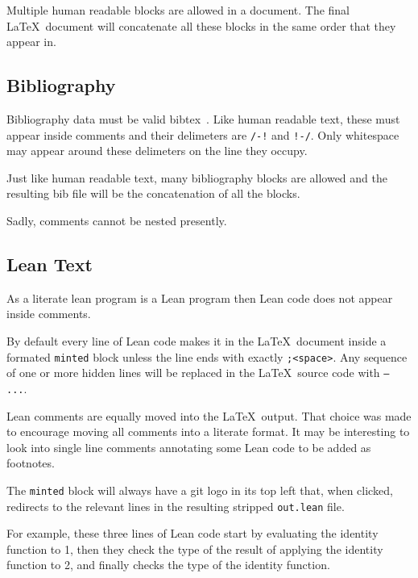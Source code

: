 Multiple human readable blocks are allowed in a document.
The final \LaTeX~document will concatenate all these blocks in the same order that they appear in.

\subsection{Bibliography}

Bibliography data must be valid bibtex~\cite{patashnik1984bibtex}.
Like human readable text, these must appear inside comments and their delimeters are \texttt{/-!} and \texttt{!-/}.
Only whitespace may appear around these delimeters on the line they occupy.

Just like human readable text, many bibliography blocks are allowed and the resulting bib file will be the concatenation of all the blocks.

Sadly, comments cannot be nested presently.

\subsection{Lean Text}

As a literate lean program is a Lean program then Lean code does not appear inside comments.

By default every line of Lean code makes it in the \LaTeX~document inside a formated \texttt{minted} block unless the line ends with exactly \texttt{;<space>}.
Any sequence of one or more hidden lines will be replaced in the \LaTeX~source code with \texttt{-- ...}.

Lean comments are equally moved into the \LaTeX~output.
That choice was made to encourage moving all comments into a literate format.
It may be interesting to look into single line comments annotating some Lean code to be added as footnotes.

The \texttt{minted} block will always have a git logo in its top left that, when clicked, redirects to the relevant lines in the resulting stripped \texttt{out.lean} file.

For example, these three lines of Lean code start by evaluating the identity function to 1,
then they check the type of the result of applying the identity function to 2, and finally
checks the type of the identity function.

\noindent{}

